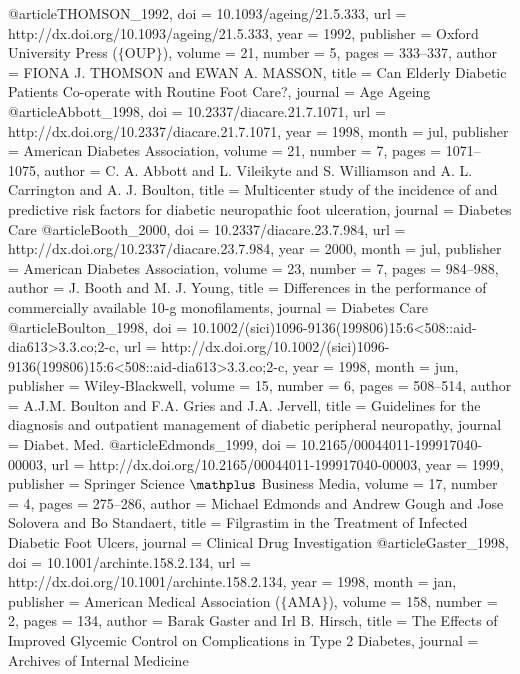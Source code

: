 @article{THOMSON_1992,
	doi = {10.1093/ageing/21.5.333},
	url = {http://dx.doi.org/10.1093/ageing/21.5.333},
	year = 1992,
	publisher = {Oxford University Press ($\lbrace$OUP$\rbrace$)},
	volume = {21},
	number = {5},
	pages = {333--337},
	author = {FIONA J. THOMSON and EWAN A. MASSON},
	title = {Can Elderly Diabetic Patients Co-operate with Routine Foot Care?},
	journal = {Age Ageing}
}
@article{Abbott_1998,
	doi = {10.2337/diacare.21.7.1071},
	url = {http://dx.doi.org/10.2337/diacare.21.7.1071},
	year = 1998,
	month = {jul},
	publisher = {American Diabetes Association},
	volume = {21},
	number = {7},
	pages = {1071--1075},
	author = {C. A. Abbott and L. Vileikyte and S. Williamson and A. L. Carrington and A. J. Boulton},
	title = {Multicenter study of the incidence of and predictive risk factors for diabetic neuropathic foot ulceration},
	journal = {Diabetes Care}
}
@article{Booth_2000,
	doi = {10.2337/diacare.23.7.984},
	url = {http://dx.doi.org/10.2337/diacare.23.7.984},
	year = 2000,
	month = {jul},
	publisher = {American Diabetes Association},
	volume = {23},
	number = {7},
	pages = {984--988},
	author = {J. Booth and M. J. Young},
	title = {Differences in the performance of commercially available 10-g monofilaments},
	journal = {Diabetes Care}
}
@article{Boulton_1998,
	doi = {10.1002/(sici)1096-9136(199806)15:6<508::aid-dia613>3.3.co;2-c},
	url = {http://dx.doi.org/10.1002/(sici)1096-9136(199806)15:6<508::aid-dia613>3.3.co;2-c},
	year = 1998,
	month = {jun},
	publisher = {Wiley-Blackwell},
	volume = {15},
	number = {6},
	pages = {508--514},
	author = {A.J.M. Boulton and F.A. Gries and J.A. Jervell},
	title = {Guidelines for the diagnosis and outpatient management of diabetic peripheral neuropathy},
	journal = {Diabet. Med.}
}
@article{Edmonds_1999,
	doi = {10.2165/00044011-199917040-00003},
	url = {http://dx.doi.org/10.2165/00044011-199917040-00003},
	year = 1999,
	publisher = {Springer Science $\mathplus$ Business Media},
	volume = {17},
	number = {4},
	pages = {275--286},
	author = {Michael Edmonds and Andrew Gough and Jose Solovera and Bo Standaert},
	title = {Filgrastim in the Treatment of Infected Diabetic Foot Ulcers},
	journal = {Clinical Drug Investigation}
}
@article{Gaster_1998,
	doi = {10.1001/archinte.158.2.134},
	url = {http://dx.doi.org/10.1001/archinte.158.2.134},
	year = 1998,
	month = {jan},
	publisher = {American Medical Association ($\lbrace$AMA$\rbrace$)},
	volume = {158},
	number = {2},
	pages = {134},
	author = {Barak Gaster and Irl B. Hirsch},
	title = {The Effects of Improved Glycemic Control on Complications in Type 2 Diabetes},
	journal = {Archives of Internal Medicine}
}
